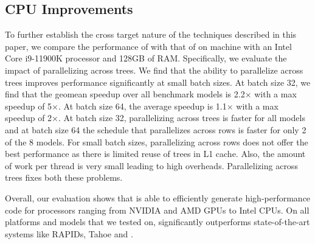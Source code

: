\subsection{CPU Improvements}
To further establish the cross target nature of the techniques described in this paper,
we compare the performance of \Treebeard{} with that of \TreebeardOLD{} on machine with an  
Intel Core i9-11900K processor and 128GB of RAM. Specifically, we evaluate the impact of parallelizing
across trees. We find that the ability to parallelize across trees improves performance 
significantly at small batch sizes. At batch size 32, we find that the geomean speedup over 
all benchmark models is 2.2$\times$ with a max speedup of 5$\times$. At batch size 64, the average speedup
is 1.1$\times$ with a max speedup of 2$\times$. At batch size 32, parallelizing across trees is faster 
for all models and at batch size 64 the \TreebeardOLD{} schedule that parallelizes across 
rows is faster for only 2 of the 8 models. For small batch sizes, parallelizing across rows does 
not offer the best performance as there is limited reuse of trees in L1 cache.
Also, the amount of work per thread is very small leading to high overheads. 
Parallelizing across trees fixes both these problems. 


Overall, our evaluation shows that \Treebeard{} is able to efficiently generate 
high-performance code for processors ranging from NVIDIA and AMD GPUs to Intel CPUs.
On all platforms and models that we tested on, \Treebeard{} significantly outperforms
state-of-the-art systems like RAPIDs, Tahoe and \TreebeardOLD{}.